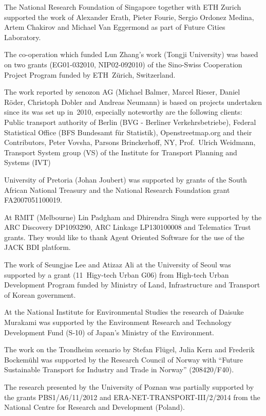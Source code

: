 The National Research Foundation of Singapore together with ETH Zurich supported the work of Alexander Erath, Pieter Fourie, Sergio Ordonez Medina, Artem Chakirov and Michael Van Eggermond as part of Future Cities Laboratory.

The co-operation which funded Lun Zhang’s work (Tongji University) was based on two grants (EG01-032010, NIP02-092010) of the Sino-Swiss Cooperation Project Program funded by ETH~Zürich, Switzerland.

The work reported by senozon AG (Michael Balmer, Marcel Rieser, Daniel Röder, Christoph Dobler and Andreas Neumann) is based on projects undertaken since its was set up in~2010, especially noteworthy are the following clients: Public transport authority of Berlin (BVG - Berliner Verkehrsbetriebe), Federal Statistical Office (BFS Bundesamt für Statistik), Openstreetmap.org and their Contributors, Peter Vovsha, Parsons Brinckerhoff, NY, Prof.~Ulrich Weidmann, Transport System group (VS) of the Institute for Transport Planning and Systems (IVT)

University of Pretoria (Johan Joubert) was supported by grants of the South African National Treasury and the National Research Foundation grant FA2007051100019. 

At RMIT (Melbourne) Lin Padgham and Dhirendra Singh were supported by the ARC Discovery DP1093290, ARC Linkage LP130100008 and Telematics Trust grants. They would like to thank Agent Oriented Software for the use of the JACK BDI platform.

The work of Seungjae Lee and Atizaz Ali at the University of Seoul was supported by a grant (11~Higy-tech Urban G06) from High-tech Urban Development Program funded by Ministry of Land, Infrastructure and Transport of Korean government.

At the National Institute for Environmental Studies the research of Daisuke Murakami was supported by the Environment Research and Technology Development Fund (S-10) of Japan's Ministry of the Environment.

The work on the Trondheim scenario by Stefan Flügel, Julia Kern and Frederik Bockemühl was supported by the Research Council of Norway with ``Future Sustainable Transport for Industry and Trade in Norway'' (208420/F40).

The research presented by the University of Poznan was partially supported by the grants PBS1/A6/11/2012 and ERA-NET-TRANSPORT-III/2/2014 from the National Centre for Research and Development (Poland).

